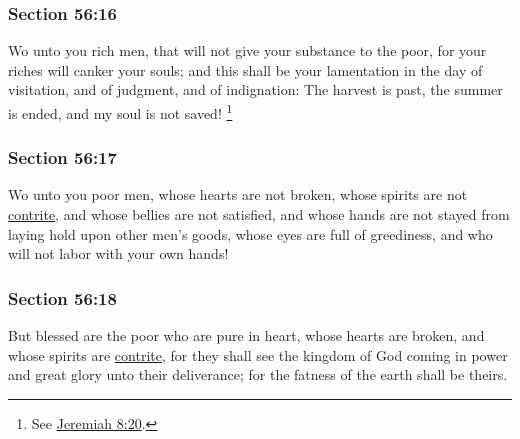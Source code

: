 	\subsubsection{Section 56:16} %
		\label{DC56-16}

		Wo unto you rich men, that will not give your substance to the poor, for your riches will canker your souls; and this shall be your lamentation in the day of visitation, and of judgment, and of indignation: The harvest is past, the summer is ended, and my soul is not saved!%
			\footnote{%
				See \hyperref[JEREMIAH-8-20]{Jeremiah 8:20}.
				}


	\subsubsection{Section 56:17} %
		\label{DC56-17}

		Wo unto you poor men, whose hearts are not broken, whose spirits are not \hyperref[CONTRITE]{contrite}, and whose bellies are not satisfied, and whose hands are not stayed from laying hold upon other men's goods, whose eyes are full of greediness, and who will not labor with your own hands!


	\subsubsection{Section 56:18} %
		\label{DC56-18}

		But blessed are the poor who are pure in heart, whose hearts are broken, and whose spirits are \hyperref[CONTRITE]{contrite}, for they shall see the kingdom of God coming in power and great glory unto their deliverance; for the fatness of the earth shall be theirs.

